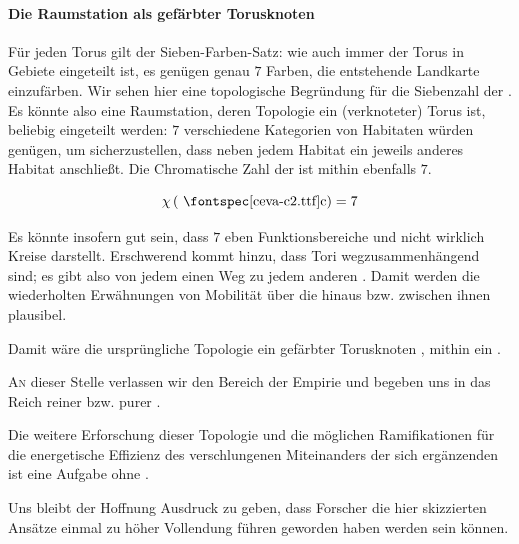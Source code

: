 \paragraph{Die Raumstation als gefärbter Torusknoten}

Für jeden Torus gilt der Sieben-Farben-Satz: wie auch immer der Torus in Gebiete eingeteilt ist, es genügen genau $7$ Farben, die entstehende Landkarte einzufärben. Wir sehen hier eine topologische Begründung für die Siebenzahl der . Es könnte also eine Raumstation, deren Topologie ein (verknoteter) Torus ist, beliebig eingeteilt werden: $7$ verschiedene Kategorien von Habitaten würden genügen, um sicherzustellen, dass neben jedem Habitat ein jeweils anderes Habitat anschließt. Die Chromatische Zahl der  ist mithin ebenfalls $7$.

\begin{equation}\label{eq:chromazahl}
    \chi\left( \text{\ceva{c}}
    \right) = 7
\end{equation}

Es könnte insofern gut sein, dass $7$  eben Funktionsbereiche und nicht wirklich Kreise darstellt. 
Erschwerend kommt hinzu, dass Tori wegzusammenhängend sind; es gibt also von jedem  einen Weg zu jedem anderen . Damit werden die wiederholten Erwähnungen von Mobilität über die  hinaus bzw. zwischen ihnen plausibel.

Damit wäre die ursprüngliche Topologie ein gefärbter Torusknoten , mithin ein .

\begin{newstuff}
\lettrine{A}{n} dieser Stelle  verlassen wir  den Bereich der Empirie und begeben uns in das Reich reiner  bzw. purer .

Die weitere Erforschung dieser Topologie und die möglichen Ramifikationen für die energetische Effizienz des verschlungenen Miteinanders der sich ergänzenden  ist eine Aufgabe ohne .

Uns bleibt der Hoffnung Ausdruck zu geben, dass  Forscher die hier skizzierten Ansätze einmal zu höher Vollendung führen geworden haben werden sein können.

\end{newstuff}




    
